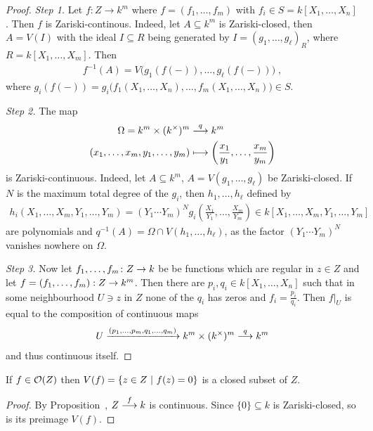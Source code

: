 \documentclass[a4paper,parskip=half,numbers=enddot, DIV=12]{scrreprt}
\begin{document}
	\begin{proof}\emph{Step 1.} Let $f\colon Z\to k^m$ where $f=(f_1,\ldots,f_m)$ with $f_i\in S=k[X_1,\ldots,X_n]$. Then $f$ is Zariski-continous. Indeed, let $A\subseteq k^m$ is Zariski-closed, then $A=V(I)$ with the ideal $I\subseteq R$ being generated by $I=(g_1,\ldots,g_\ell)_R$, where $R=k[X_1,\ldots,X_m]$. Then
	\begin{align*}
		f^{-1}(A)=V\big(g_1(f(-)),\ldots,g_\ell(f(-))\big)\;,
	\end{align*} 
	where $g_i(f(-))=g_i\big(f_1(X_1,\ldots,X_n),\ldots,f_m(X_1,\ldots,X_n)\big)\in S$.

	\emph{Step 2.} The map
	\begin{align*}
		\Omega=k^m\times(k^\times)^m&\morphism[q]k^m\\
		(x_1,\ldots,x_m,y_1,\ldots,y_m)&\longmapsto \left(\frac{x_1}{y_1},\ldots,\frac{x_m}{y_m}\right)
	\end{align*}
	is Zariski-continuous. Indeed, let $A\subseteq k^m$, $A=V(g_1,\ldots,g_\ell)$ be Zariski-closed. If $N$ is the maximum total degree of the $g_i$, then $h_1,\ldots,h_\ell$ defined by 
	\begin{align*}
		h_i(X_1,\ldots,X_m,Y_1,\ldots,Y_m)=(Y_1\cdots Y_m)^Ng_i\left(\frac{X_1}{Y_1},\ldots,\frac{X_m}{Y_m}\right)\in k[X_1,\ldots,X_m,Y_1,\ldots,Y_m]
	\end{align*}
	are polynomials and $q^{-1}(A)=\Omega\cap V(h_1,\ldots,h_\ell)$, as the factor $(Y_1\cdots Y_m)^N$ vanishes nowhere on $\Omega$.
	
	\emph{Step 3.} Now let $f_1,\ldots,f_m\colon Z\morphism k$ be be functions which are regular in $z\in Z$ and let $f =(f_1,\ldots,f_m):Z\morphism k^m$. Then there are $p_i,q_i\in k[X_1,\ldots,X_n]$ such that in some neighbourhood $U\ni z$ in $Z$ none of the $q_i$ has zeros and $f_i=\frac{p_i}{q_i}$. Then $f|_U$ is equal to the composition of continuous maps
		\begin{align*}
			U\xrightarrow{(p_1,\ldots,p_m,q_1,\ldots,q_m)}k^m\times(k^\times)^m\morphism[q]k^m
		\end{align*}
		and thus continuous itself.
	\end{proof}
	\begin{cor}
		If $f\in \mathcal{O}(Z)$ then $V(f)=\left\{z\in Z\ \middle|\  f(z)=0\right\}$ is a closed subset of $Z$.
	\end{cor}
	\begin{proof}
		By Proposition~, $Z\morphism[f]k$ is continuous. Since $\{0\}\subseteq k$ is Zariski-closed, so is its preimage $V(f)$.
	\end{proof}
\end{document}
